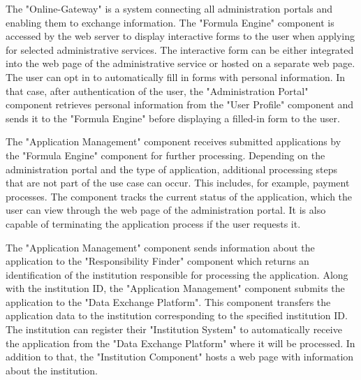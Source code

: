The "Online-Gateway" is a system connecting all administration portals and enabling them to exchange information. The "Formula Engine" component is accessed by the web server to display interactive forms to the user when applying for selected administrative services. The interactive form can be either integrated into the web page of the administrative service or hosted on a separate web page. The user can opt in to automatically fill in forms with personal information. In that case, after authentication of the user, the "Administration Portal" component retrieves personal information from the "User Profile" component and sends it to the "Formula Engine" before displaying a filled-in form to the user. 

The "Application Management" component receives submitted applications by the "Formula Engine" component for further processing. Depending on the administration portal and the type of application, additional processing steps that are not part of the use case can occur. This includes, for example, payment processes. The component tracks the current status of the application, which the user can view through the web page of the administration portal. It is also capable of terminating the application process if the user requests it. 

The "Application Management" component sends information about the application to the "Responsibility Finder" component which returns an identification of the institution responsible for processing the application. Along with the institution ID, the "Application Management" component submits the application to the "Data Exchange Platform". This component transfers the application data to the institution corresponding to the specified institution ID. The institution can register their "Institution System" to automatically receive the application from the "Data Exchange Platform" where it will be processed. In addition to that, the "Institution Component" hosts a web page with information about the institution.